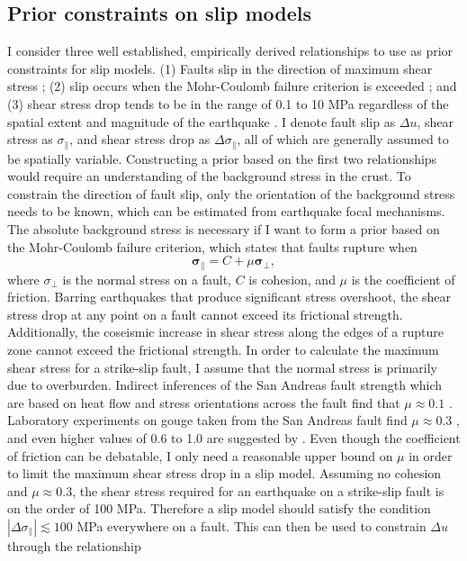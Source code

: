 \documentclass[12pt]{article}
\begin{document}
\subsection*{Prior constraints on slip models}
I consider three well established, empirically derived relationships to use as prior constraints for slip models. (1) Faults slip in the direction of maximum shear stress \citep{Wallace1951}; (2) slip occurs when the Mohr-Coulomb failure criterion is exceeded \citep{Byerlee1978}; and (3) shear stress drop tends to be in the range of 0.1 to 10 MPa regardless of the spatial extent and magnitude of the earthquake \citep{Kanamori1975,Shearer2006}. I denote fault slip as $\Delta u$, shear stress as $\sigma_\parallel$, and shear stress drop as $\Delta \sigma_\parallel$, all of which are generally assumed to be spatially variable.  Constructing a prior based on the first two relationships would require an understanding of the background stress in the crust.  To constrain the direction of fault slip, only the orientation of the background stress needs to be known, which can be estimated from earthquake focal mechanisms.  The absolute background stress is necessary if I want to form a prior based on the Mohr-Coulomb failure criterion, which states that faults rupture when 
\begin{equation}\label{eq:MohrCoulomb}
  \mathbf{\sigma_\parallel} = C + \mu \mathbf{\sigma_\bot},
\end{equation}
where $\sigma_\bot$ is the normal stress on a fault, $C$ is cohesion, and $\mu$ is the coefficient of friction.  Barring earthquakes that produce significant stress overshoot, the shear stress drop at any point on a fault cannot exceed its frictional strength.  Additionally, the coseismic increase in shear stress along the edges of a rupture zone cannot exceed the frictional strength. In order to calculate the maximum shear stress for a strike-slip fault, I assume that the normal stress is primarily due to overburden.  Indirect inferences of the San Andreas fault strength which are based on heat flow and stress orientations across the fault find that $\mu\approx0.1$ \citep{Brune1969,Zoback1987}.  Laboratory experiments on gouge taken from the San Andreas fault find $\mu\approx0.3$ \citep{Carpenter2011}, and even higher values of 0.6 to 1.0 are suggested by \citet{Byerlee1978}. Even though the coefficient of friction can be debatable, I only need a reasonable upper bound on $\mu$ in order to limit the maximum shear stress drop in a slip model.  Assuming no cohesion and $\mu\approx0.3$, the shear stress required for an earthquake on a strike-slip fault is on the order of 100 MPa.  Therefore a slip model should satisfy the condition $|\Delta\sigma_\parallel|\lesssim 100$ MPa everywhere on a fault.  This can then be used to constrain $\Delta u$ through the relationship
\end{document}
